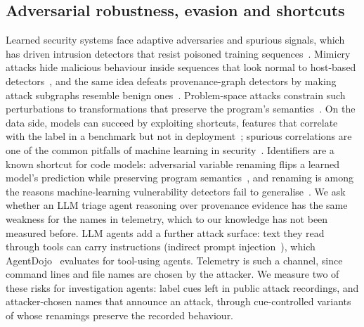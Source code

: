 \subsection{Adversarial robustness, evasion and shortcuts}
Learned security systems face adaptive adversaries and spurious signals, which has driven intrusion detectors
that resist poisoned training sequences~\cite{anaedevha2026mambashield}. Mimicry attacks hide malicious
behaviour inside sequences that look normal to host-based detectors~\cite{wagner2002mimicry}, and the same
idea defeats provenance-graph detectors by making attack subgraphs resemble benign ones~\cite{goyal2023mimicry}.
Problem-space attacks constrain such perturbations to transformations that preserve the program's
semantics~\cite{pierazzi2020problemspace}. On the data side, models can succeed by exploiting shortcuts,
features that correlate with the label in a benchmark but not in deployment~\cite{geirhos2020shortcut};
spurious correlations are one of the common pitfalls of machine learning in security~\cite{arp2022dosdonts}.
Identifiers are a known shortcut for code models: adversarial variable renaming flips a learned model's
prediction while preserving program semantics~\cite{yefet2020adversarial}, and renaming is among the reasons
machine-learning vulnerability detectors fail to generalise~\cite{risse2024limits}. We ask whether an
LLM triage agent reasoning over provenance evidence has the same weakness for the names in telemetry, which to
our knowledge has not been measured before.
LLM agents add a further attack surface: text they read through tools can carry instructions
(indirect prompt injection~\cite{greshake2023indirect}), which AgentDojo~\cite{debenedetti2024agentdojo}
evaluates for tool-using agents. Telemetry is such a channel, since command lines and file names are chosen by
the attacker. We measure two of these risks for investigation agents: label cues left in public attack
recordings, and attacker-chosen names that announce an attack, through cue-controlled variants of \bench
whose renamings preserve the recorded behaviour.
